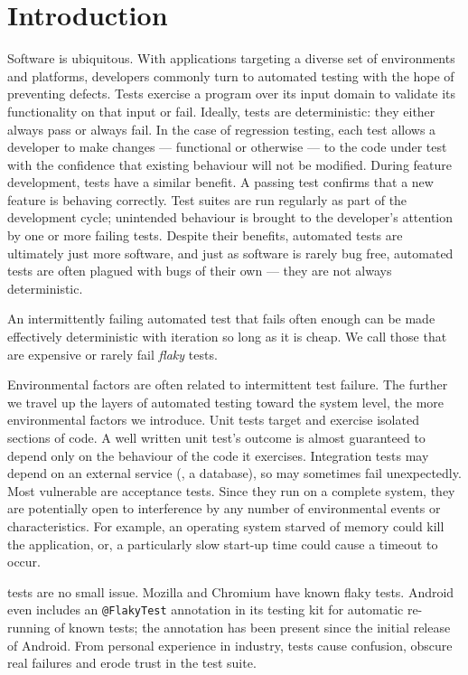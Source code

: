 \section{Introduction}
\label{sec:intro}

Software is ubiquitous. With applications targeting a diverse set of
environments and platforms, developers commonly turn to automated testing with
the hope of preventing defects. Tests exercise a program over its input domain
to validate its functionality on that input or fail. Ideally, tests are
deterministic: they either always pass or always fail. In the case of regression
testing, each test allows a developer to make changes --- functional or
otherwise --- to the code under test with the confidence that existing behaviour
will not be modified. During feature development, tests have a similar benefit.
A passing test confirms that a new feature is behaving correctly. Test suites
are run regularly as part of the development cycle; unintended behaviour is
brought to the developer's attention by one or more failing tests. Despite their
benefits, automated tests are ultimately just more software, and just as
software is rarely bug free, automated tests are often plagued with bugs of
their own --- they are not always deterministic.

An intermittently failing automated test that fails often enough can be made
effectively deterministic with iteration so long as it is cheap. We call those
that are expensive or rarely fail \emph{flaky} tests.

Environmental factors are often related to intermittent test failure. The
further we travel up the layers of automated testing toward the system level,
the more environmental factors we introduce. Unit tests target and exercise
isolated sections of code. A well written unit test's outcome is almost
guaranteed to depend only on the behaviour of the code it exercises. Integration
tests may depend on an external service (\eg, a database), so may sometimes fail
unexpectedly. Most vulnerable are acceptance tests. Since they run on a complete
system, they are potentially open to interference by any number of environmental
events or characteristics. For example, an operating system starved of memory
could kill the application, or, a particularly slow start-up time could cause a
timeout to occur.

\Flaky tests are no small issue. Mozilla\cite{mozillaFlakyTestBug} and Chromium
have known flaky tests. Android even includes an {\tt @FlakyTest}
annotation\cite{androidFlakyInterface} in its testing kit for automatic re-
running of known \flaky tests; the annotation has been present since the initial
release of Android. From personal experience in industry, \flaky tests cause
confusion, obscure real failures and erode trust in the test suite.

